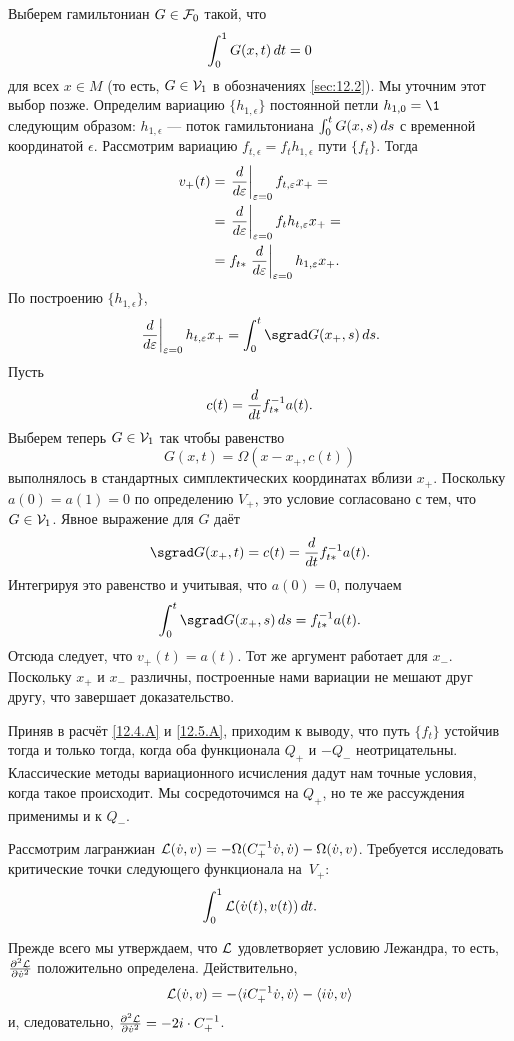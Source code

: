 Выберем гамильтониан $G\in\mathcal{F}_0$ такой, что
\[\int_0^1G(x, t)\,d t = 0\]
для всех $x\in M$ (то есть, $G\in\mathcal{V}_1$ в обозначениях \ref{sec:12.2}).
Мы уточним этот выбор позже.
Определим вариацию $\{h_{1,\epsilon}\}$ постоянной петли $h_{1,0} =
\1$ следующим образом: $h_{1,\epsilon}$ — поток гамильтониана
$\int_0^tG(x,s)\,d s$ с временной координатой $\epsilon$. 
Рассмотрим вариацию $f_{t,\epsilon} = f_th_{1,\epsilon}$ пути $\{f_t\}$.
Тогда
\begin{align*}
v_+(t) &= \left.\frac{d}{d \varepsilon}\right|_{\varepsilon=0} f_{t,\varepsilon} x_+ =
\\
&=\left.\frac{d}{d \varepsilon}\right|_{\varepsilon=0}f_th_{t,\varepsilon} x_+=
\\
&=
f_{t*} \left.\frac{d}{d \varepsilon}\right|_{\varepsilon=0} h_{1,\varepsilon} x_+.
\end{align*}
По построению $\{h_{1,\epsilon}\}$,
\[\left.\frac{\d}{\d \epsilon}\right|_{\epsilon=0}h_{t,\epsilon}x_+
=
\int_0^t\sgrad G(x_+,s)\,\d s.\]
Пусть 
\[c(t) = \frac{d}{d t}f^{-1}_{t*} a(t).\]
Выберем теперь $G \in \mathcal{V}_1$ так чтобы равенство
\[G(x, t) = \Omega(x - x_+, c(t))\]
выполнялось в стандартных симплектических координатах вблизи $x_+$.
Поскольку $a(0) = a(1) = 0$ по определению $V_+$, это условие
согласовано с тем, что $G\in\mathcal{V}_1$. 
Явное выражение для $G$ даёт 
\[\sgrad G(x_+, t) = c(t) = \frac{\d}{\d t}f^{-1}_{t*} a(t).\]
Интегрируя это равенство и учитывая, что $a(0) = 0$, получаем
\[\int_0^t\sgrad G(x_+, s)\,\d s = f_{t*}^{-1}a(t).\]
Отсюда следует, что $v_+(t) = a(t)$.
Тот же аргумент работает для $x_-$.
Поскольку $x_+$ и $x_-$ различны, построенные нами вариации не мешают
друг другу, 
что завершает доказательство.
\qeds

Приняв в расчёт \ref{12.4.A} и \ref{12.5.A}, приходим к выводу, что
путь $\{f_t\}$ устойчив тогда и только тогда, когда оба
функционала $Q_+$ и $-Q_-$ неотрицательны. 
Классические методы вариационного исчисления дадут нам точные условия,
когда такое происходит. 
Мы сосредоточимся на $Q_+$, но те же рассуждения применимы и к $Q_-$.

Рассмотрим лагранжиан $\mathcal{L}(\dot v, v) = -\Omega(C_+^{-1}\dot v, \dot v)
- \Omega(\dot v, v)$. 
Требуется исследовать критические точки следующего функционала на~$V_+$:
\[\int_0^1 \mathcal{L}(\dot v(t), v(t))\,d t.\]

Прежде всего мы утверждаем, что $\mathcal{L}$ удовлетворяет условию Лежандра,
то есть, $\tfrac{\partial^2\mathcal{L}}{\partial\dot v^2}$ положительно
определена. 
Действительно, 
\[\mathcal{L}( \dot v, v) = -\langle iC_+^{-1} \dot v,\dot v\rangle - \langle i\dot v, v\rangle\]
и, следовательно, $\tfrac{\partial^2\mathcal{L}}{\partial\dot v^2}= - 2i\cdot C_+^{-1}$.

